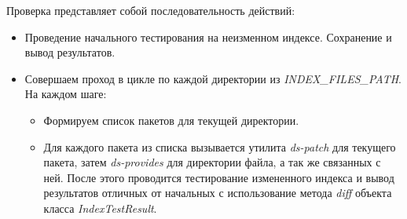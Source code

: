 Проверка представляет собой последовательность действий:\\
\begin{itemize}
\item{Проведение начального тестирования на неизменном индексе. Сохранение
и вывод результатов.}
\item{Совершаем проход в цикле по каждой директории из \emph{INDEX\_FILES\_PATH}. На
каждом шаге:
	\begin{itemize}
	\item{Формируем список пакетов для текущей директории.}
	\item{Для каждого пакета из списка вызывается утилита \textit{ds-patch }
	для текущего пакета, затем \textit{ds-provides} для директории файла, а 
	так же связанных с ней. После этого проводится тестирование
	измененного индекса и вывод результатов отличных от начальных
	с использование метода \textit{diff} объекта класса \textit{IndexTestResult}.}
	\end{itemize}
}
\end{itemize}







